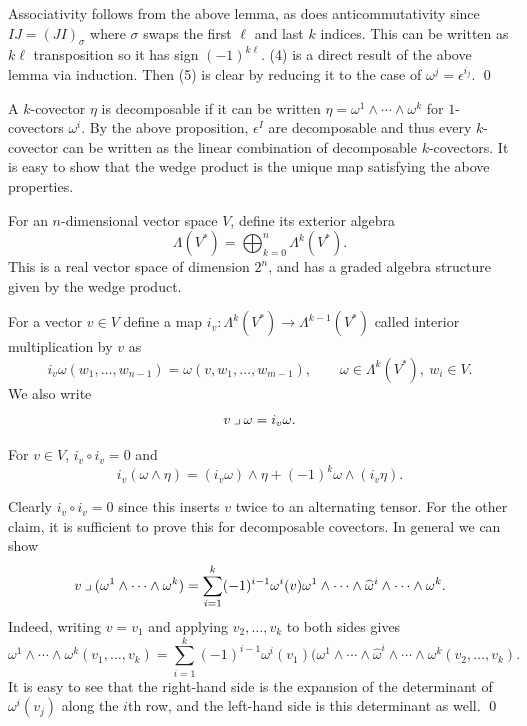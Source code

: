     Associativity follows from the above lemma, as does anticommutativity since $IJ=(JI)_\sigma$ where $\sigma$ swaps the first $\ell$ and last $k$ indices.
    This can be written as $k\ell$ transposition so it has sign $(-1)^{k\ell}$.
    (4) is a direct result of the above lemma via induction.
    Then (5) is clear by reducing it to the case of $\omega^j=\epsilon^{i_j}$.
    \qed

\eproof

A $k$-covector $\eta$ is {\emphcolor decomposable} if it can be written $\eta=\omega^1\wedge\cdots\wedge\omega^k$ for $1$-covectors $\omega^i$.
By the above proposition, $\epsilon^I$ are decomposable and thus every $k$-covector can be written as the linear combination of decomposable $k$-covectors.
It is easy to show that the wedge product is the unique map satisfying the above properties.

\bdefn

    For an $n$-dimensional vector space $V$, define its {\emphcolor exterior algebra}
    $$ \Lambda(V^*) = \bigoplus_{k=0}^n\Lambda^k(V^*) . $$
    This is a real vector space of dimension $2^n$, and has a graded algebra structure given by the wedge product.

\edefn

\bdefn

    For a vector $v\in V$ define a map $i_v\colon\Lambda^k(V^*)\to\Lambda^{k-1}(V^*)$ called {\emphcolor interior multiplication} by $v$ as
    $$ i_v\omega(w_1,\dots,w_{n-1}) = \omega(v,w_1,\dots,w_{m-1}),\qquad \omega\in\Lambda^k(V^*),\ w_i\in V . $$
    We also write
    $$ v\imult\omega = i_v\omega . $$

\edefn

\blemm

    For $v\in V$, $i_v\circ i_v=0$ and
    $$ i_v(\omega\wedge\eta) = (i_v\omega)\wedge\eta + (-1)^k\omega\wedge(i_v\eta) . $$

\elemm

\bproof

    Clearly $i_v\circ i_v=0$ since this inserts $v$ twice to an alternating tensor.
    For the other claim, it is sufficient to prove this for decomposable covectors.
    In general we can show
    $$ v\imult(\omega^1\wedge\cdots\wedge\omega^k) = \sum_{i=1}^k(-1)^{i-1}\omega^i(v)\omega^1\wedge\cdots\wedge\hat\omega^i\wedge\cdots\wedge\omega^k . $$
    Indeed, writing $v=v_1$ and applying $v_2,\dots,v_k$ to both sides gives
    $$ \omega^1\wedge\cdots\wedge\omega^k(v_1,\dots,v_k) = \sum_{i=1}^k(-1)^{i-1}\omega^i(v_1)(\omega^1\wedge\cdots\wedge\hat\omega^i\wedge\cdots\wedge\omega^k(v_2,\dots,v_k) . $$
    It is easy to see that the right-hand side is the expansion of the determinant of $\omega^i(v_j)$ along the $i$th row, and the left-hand side is this determinant as well.
    \qed

